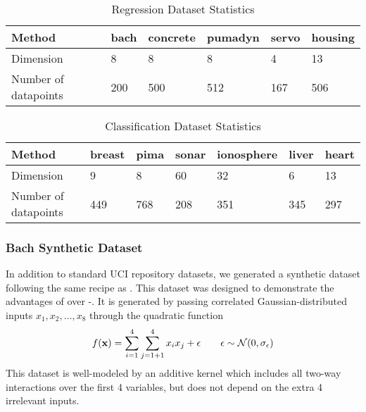 \begin{table}[h]
\caption{Regression Dataset Statistics}
\label{tbl:Regression Dataset Statistics}
\begin{center}
\begin{tabular}{l | lllll}
Method & bach & concrete & pumadyn & servo & housing \\ \hline
Dimension      & 8    & 8        & 8       & 4     & 13 \\
Number of datapoints       & 200  & 500      & 512     & 167   & 506
\end{tabular}
\end{center}
\label{table:regression-dataset-stats}
\end{table}
%
\begin{table}[h]
\caption{Classification Dataset Statistics}
\label{tbl:Classification Dataset Statistics}
\begin{center}
\begin{tabular}{l | llllll}
Method & breast & pima & sonar & ionosphere & liver & heart\\ \hline
Dimension      & 9      & 8    & 60    & 32         & 6     & 13 \\
Number of datapoints      & 449    & 768  & 208   & 351        & 345   & 297
\end{tabular}
\end{center}
\label{table:classification-dataset-stats}
\end{table}

\subsubsection{Bach Synthetic Dataset}
In addition to standard UCI repository datasets, we generated a synthetic dataset following the same recipe as \citet{DBLP:journals/corr/abs-0909-0844}.
This dataset was designed to demonstrate the advantages of \HKL{} over \gp{}-\SE{}.
It is generated by passing correlated Gaussian-distributed inputs $x_1, x_2, \dots, x_8$ through the quadratic function
%
\begin{align}
f({\bf{x}}) = \sum_{i=1}^4 \sum_{j=1+1}^4 x_i x_j + \epsilon \qquad \epsilon \sim \mathcal{N}\!\left(0,\sigma_\epsilon\right)
\end{align}
%
This dataset is well-modeled by an additive kernel which includes all two-way interactions over the first 4 variables, but does not depend on the extra 4 irrelevant inputs.%

